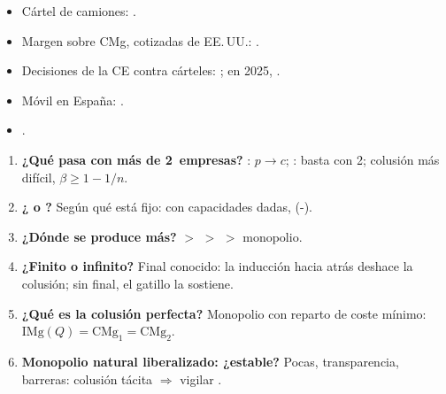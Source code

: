 \documentclass{article}
\begin{document}
\begin{columnas}
\anexorepaso
{}
\begin{itemize}
\item Cártel de camiones: .
\item Margen sobre CMg, cotizadas de EE.\,UU.: .
\item Decisiones de la CE contra cárteles: ; en 2025, .
\item Móvil en España: .
\item {}.
\end{itemize}
\begin{enumerate}
\item \textbf{¿Qué pasa con más de 2~empresas?} : $p\to c$; : basta con 2; colusión más difícil, $\beta\geq1-1/n$.
\item \textbf{¿ o ?} Según qué está fijo: con capacidades dadas,  (-).
\item \textbf{¿Dónde se produce más?}  $>$  $>$  $>$ monopolio.
\item \textbf{¿Finito o infinito?} Final conocido: la inducción hacia atrás deshace la colusión; sin final, el gatillo la sostiene.
\item \textbf{¿Qué es la colusión perfecta?} Monopolio con reparto de coste mínimo: $\mathrm{IMg}(Q)=\mathrm{CMg}_1=\mathrm{CMg}_2$.
\item \textbf{Monopolio natural liberalizado: ¿estable?} Pocas, transparencia, barreras: colusión tácita $\Rightarrow$ vigilar .
\end{enumerate}

\end{columnas}
\end{document}
